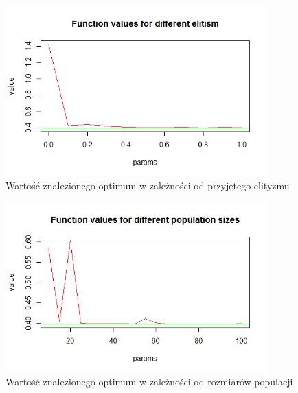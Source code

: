 \documentclass[11pt, a4paper]{article}
\begin{document}
\begin{figure}[H]
	\begin{center}
		\includegraphics[width=0.9\textwidth]{./assets/branin4.png} %
		\caption{Wartość znalezionego optimum w zależności od przyjętego elityzmu}
		\label{fig:branin4}
	\end{center}
\end{figure}

\begin{figure}[H]
	\begin{center}
		\includegraphics[width=0.9\textwidth]{./assets/branin5.png} %
		\caption{Wartość znalezionego optimum w zależności od rozmiarów populacji}
		\label{fig:branin5}
	\end{center}
\end{figure}
\end{document}
